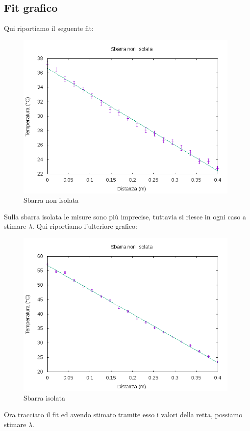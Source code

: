 \documentclass[a4paper,10pt]{article}
\begin{document}
\subsection{Fit grafico}
Qui riportiamo il seguente fit:
\begin{figure}[H]
 \centering
 \caption{Sbarra non isolata}
 \includegraphics[width=11cm]{Non isolata.png}
\end{figure}
Sulla sbarra isolata le misure sono più imprecise, tuttavia si riesce in ogni caso a stimare $\lambda$.
Qui riportiamo l'ulteriore grafico:
\begin{figure}[H]
 \centering
 \caption{Sbarra isolata}
 \includegraphics[width=11cm]{Isolata.png}
\end{figure}
Ora tracciato il fit ed avendo stimato tramite esso i valori della retta, possiamo stimare $\lambda$.
\end{document}
